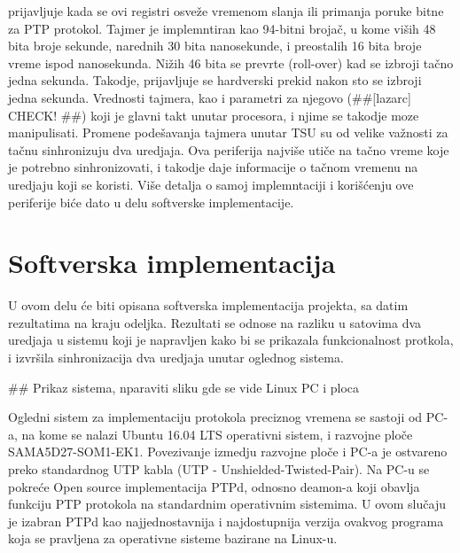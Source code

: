 \documentclass[a4paper,12pt, master]{etf}
\begin{document}
	prijavljuje kada se ovi	registri osve\v{z}e vremenom slanja ili primanja poruke bitne za PTP
	protokol. Tajmer je implemntiran kao 94-bitni broja\v{c}, u kome vi\v{s}ih 48 bita broje
	sekunde, narednih 30 bita nanosekunde, i preostalih 16 bita broje vreme ispod nanosekunda.
	Ni\v{z}ih 46 bita se prevrte (roll-over) kad se izbroji ta\v{c}no jedna sekunda. Takodje,
	prijavljuje se hardverski prekid nakon sto se izbroji jedna sekunda. Vrednosti tajmera, kao
	i parametri za njegovo (\#\#[lazarc] CHECK! \#\#) koji je glavni takt unutar procesora, i njime
	se takodje moze manipulisati. Promene pode\v{s}avanja tajmera unutar TSU su od velike
	va\v{z}nosti za ta\v{c}nu sinhronizuju dva uredjaja. Ova periferija najvi\v{s}e uti\v{c}e na
	ta\v{c}no vreme koje je potrebno sinhronizovati, i takodje daje informacije o ta\v{c}nom
	vremenu na uredjaju koji se koristi. Vi\v{s}e detalja o samoj implemntaciji i
	kori\v{s}\'{c}enju ove periferije bi\'{c}e dato u delu softverske implementacije.

	\newpage

	\chapter{Softverska implementacija}

    U ovom delu \'{c}e biti opisana softverska implementacija projekta, sa datim rezultatima na kraju
    odeljka. Rezultati se odnose na razliku u satovima dva uredjaja u sistemu koji je napravljen kako bi se
    prikazala funkcionalnost protkola, i izvr\v{s}ila sinhronizacija dva uredjaja unutar oglednog sistema.

    \#\# Prikaz sistema, nparaviti sliku gde se vide Linux PC i ploca

    Ogledni sistem za implementaciju protokola preciznog vremena se sastoji od PC-a, na kome se nalazi Ubuntu
    16.04 LTS operativni sistem, i razvojne plo\v{c}e SAMA5D27-SOM1-EK1. Povezivanje izmedju razvojne
    plo\v{c}e i PC-a je ostvareno preko standardnog UTP kabla (UTP - Unshielded-Twisted-Pair). Na PC-u se
    pokre\'{c}e Open source implementacija PTPd, odnosno deamon-a koji obavlja funkciju PTP protokola na
    standardnim operativnim sistemima. U ovom slu\v{c}aju je izabran PTPd kao najjednostavnija i
    najdostupnija verzija ovakvog programa koja se pravljena za operativne sisteme bazirane na Linux-u.
\end{document}
